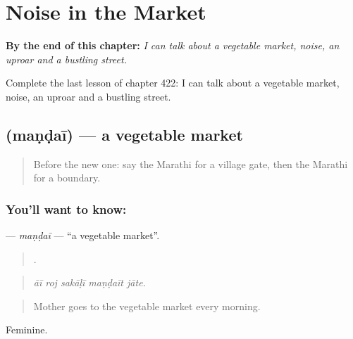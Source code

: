 
\chapter{Noise in the Market}
\label{ch:mr-noise-in-the-market}

\begin{chapteropening}
\textbf{By the end of this chapter:} \emph{I can talk about a vegetable market, noise, an uproar and a bustling street.}

Complete the last lesson of chapter 422: I can talk about a vegetable market, noise, an uproar and a bustling street.
\end{chapteropening}

\section[\texorpdfstring{\mr{मंडई} (maṇḍaī)}{मंडई (maṇḍaī)}]{ (maṇḍaī) — a vegetable market}

\label{lesson:MR-C422-mandai}



\begin{quote}
Before the new one: say the Marathi for a village gate, then the Marathi for a boundary.
\end{quote}

\subsection*{You'll want to know: }
\textbf{} — \emph{maṇḍaī} — \textquotedblleft{}a vegetable market\textquotedblright{}.

\begin{quote}
    .
\end{quote}

\begin{quote}
\emph{āī roj sakāḷī maṇḍaīt jāte.}
\end{quote}

\begin{quote}
Mother goes to the vegetable market every morning.
\end{quote}

Feminine.

